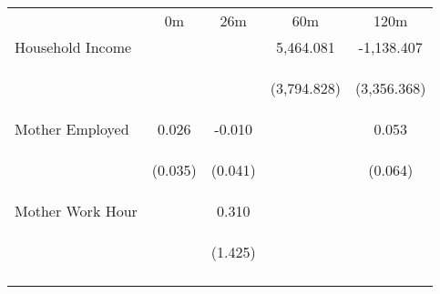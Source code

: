 \begin{tabular}{lcccc}
\hline \noalign{\smallskip} & 0m & 26m & 60m & 120m\\
\noalign{\smallskip}\hline \noalign{\smallskip}Household Income &  &  & 5,464.081 & -1,138.407\\
 & \begin{footnotesize}\end{footnotesize} & \begin{footnotesize}\end{footnotesize} & \begin{footnotesize}(3,794.828)\end{footnotesize} & \begin{footnotesize}(3,356.368)\end{footnotesize}\\
\noalign{\smallskip}Mother Employed & 0.026 & -0.010 &  & 0.053\\
 & \begin{footnotesize}(0.035)\end{footnotesize} & \begin{footnotesize}(0.041)\end{footnotesize} & \begin{footnotesize}\end{footnotesize} & \begin{footnotesize}(0.064)\end{footnotesize}\\
\noalign{\smallskip}Mother Work Hour &  & 0.310 &  & \\
 & \begin{footnotesize}\end{footnotesize} & \begin{footnotesize}(1.425)\end{footnotesize} & \begin{footnotesize}\end{footnotesize} & \begin{footnotesize}\end{footnotesize}\\
\noalign{\smallskip}\hline\end{tabular}\\
